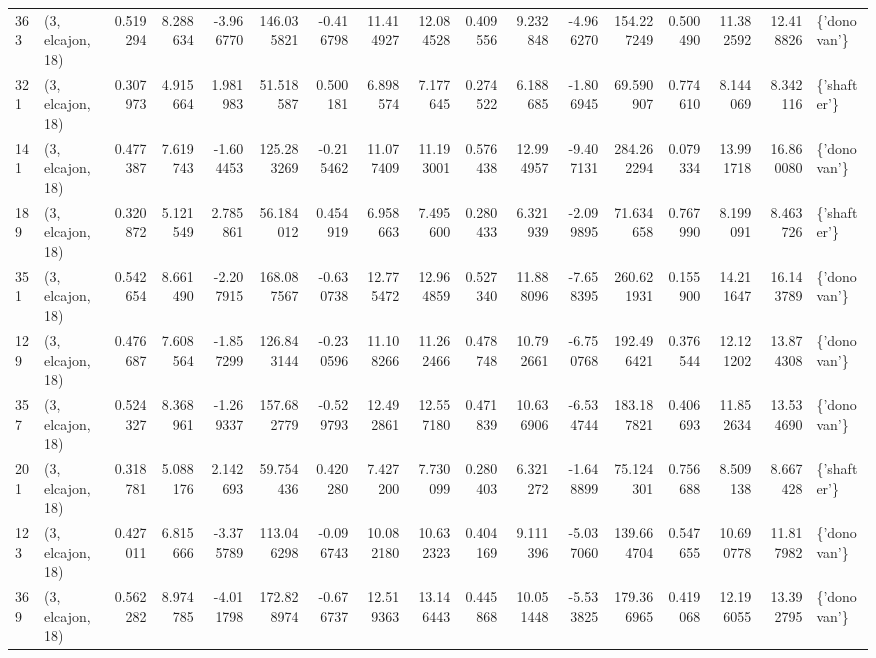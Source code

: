 \begin{tabular}{llrrrrrrrrrrrrrrl}
363 &  (3, elcajon, 18) &   0.519294 &   8.288634 &  -3.966770 &   146.035821 &  -0.416798 &  11.414927 &  12.084528 &  0.409556 &   9.232848 &  -4.966270 &   154.227249 &   0.500490 &  11.382592 &  12.418826 &  \{'donovan'\} \\
321 &  (3, elcajon, 18) &   0.307973 &   4.915664 &   1.981983 &    51.518587 &   0.500181 &   6.898574 &   7.177645 &  0.274522 &   6.188685 &  -1.806945 &    69.590907 &   0.774610 &   8.144069 &   8.342116 &  \{'shafter'\} \\
141 &  (3, elcajon, 18) &   0.477387 &   7.619743 &  -1.604453 &   125.283269 &  -0.215462 &  11.077409 &  11.193001 &  0.576438 &  12.994957 &  -9.407131 &   284.262294 &   0.079334 &  13.991718 &  16.860080 &  \{'donovan'\} \\
189 &  (3, elcajon, 18) &   0.320872 &   5.121549 &   2.785861 &    56.184012 &   0.454919 &   6.958663 &   7.495600 &  0.280433 &   6.321939 &  -2.099895 &    71.634658 &   0.767990 &   8.199091 &   8.463726 &  \{'shafter'\} \\
351 &  (3, elcajon, 18) &   0.542654 &   8.661490 &  -2.207915 &   168.087567 &  -0.630738 &  12.775472 &  12.964859 &  0.527340 &  11.888096 &  -7.658395 &   260.621931 &   0.155900 &  14.211647 &  16.143789 &  \{'donovan'\} \\
129 &  (3, elcajon, 18) &   0.476687 &   7.608564 &  -1.857299 &   126.843144 &  -0.230596 &  11.108266 &  11.262466 &  0.478748 &  10.792661 &  -6.750768 &   192.496421 &   0.376544 &  12.121202 &  13.874308 &  \{'donovan'\} \\
357 &  (3, elcajon, 18) &   0.524327 &   8.368961 &  -1.269337 &   157.682779 &  -0.529793 &  12.492861 &  12.557180 &  0.471839 &  10.636906 &  -6.534744 &   183.187821 &   0.406693 &  11.852634 &  13.534690 &  \{'donovan'\} \\
201 &  (3, elcajon, 18) &   0.318781 &   5.088176 &   2.142693 &    59.754436 &   0.420280 &   7.427200 &   7.730099 &  0.280403 &   6.321272 &  -1.648899 &    75.124301 &   0.756688 &   8.509138 &   8.667428 &  \{'shafter'\} \\
123 &  (3, elcajon, 18) &   0.427011 &   6.815666 &  -3.375789 &   113.046298 &  -0.096743 &  10.082180 &  10.632323 &  0.404169 &   9.111396 &  -5.037060 &   139.664704 &   0.547655 &  10.690778 &  11.817982 &  \{'donovan'\} \\
369 &  (3, elcajon, 18) &   0.562282 &   8.974785 &  -4.011798 &   172.828974 &  -0.676737 &  12.519363 &  13.146443 &  0.445868 &  10.051448 &  -5.533825 &   179.366965 &   0.419068 &  12.196055 &  13.392795 &  \{'donovan'\} \\

\end{tabular}
